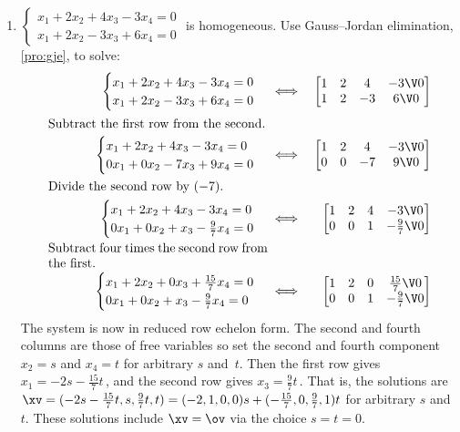 \begin{example}
\begin{enumerate}
\item \label{eg:homosysiv} 
\(\begin{cases}
x_1+2x_2+4x_3-3x_4=0\\
x_1+2x_2-3x_3+6x_4=0
\end{cases}\) is homogeneous.  
Use Gauss--Jordan elimination, \autoref{pro:gje}, to solve: 
\begin{eqnarray*}
\begin{cases}
x_1+2x_2+4x_3-3x_4=0\\
x_1+2x_2-3x_3+6x_4=0
\end{cases}
&\iff&%
\begin{bmatrix} 1&2&4&-3\V0
\\1&2&-3&6\V0
 \end{bmatrix}
\\
\parbox{0.5\linewidth}{Subtract the first row from the second.}
\\
\begin{cases}
x_1+2x_2+4x_3-3x_4=0\\
0x_1+0x_2-7x_3+9x_4=0
\end{cases}
&\iff&%
\begin{bmatrix} 1&2&4&-3\V0
\\0&0&-7&9\V0
 \end{bmatrix}
\\
\parbox{0.5\linewidth}{Divide the second row by~\((-7)\).}
\\
\begin{cases}
x_1+2x_2+4x_3-3x_4=0\\
0x_1+0x_2+x_3-\frac97x_4=0
\end{cases}
&\iff&%
\begin{bmatrix} 1&2&4&-3\V0
\\0&0&1&-\frac97\V0
 \end{bmatrix}
\\
\parbox{0.5\linewidth}{Subtract four times the second row from the first.}
\\
\begin{cases}
x_1+2x_2+0x_3+\frac{15}7x_4=0\\
0x_1+0x_2+x_3-\frac97x_4=0
\end{cases}
&\iff&%
\begin{bmatrix} 1&2&0&\frac{15}7\V0
\\0&0&1&-\frac97\V0
 \end{bmatrix}
\end{eqnarray*}
The system is now in reduced row echelon form.  
The second and fourth columns are those of free variables so set the second and fourth component \(x_2=s\) and \(x_4=t\) for arbitrary \(s\) and~\(t\).
Then the first row gives \(x_1=-2s-\frac{15}7t\)\,, and the second row gives \(x_3=\frac97t\)\,.
That is, the solutions are \(\xv=(-2s-\frac{15}7t,s,\frac97t,t) =(-2,1,0,0)s+(-\frac{15}7,0,\frac97,1)t\) for arbitrary \(s\) and~\(t\).
These solutions include \(\xv=\ov\) via the choice \(s=t=0\).
\end{enumerate}
\end{example}




